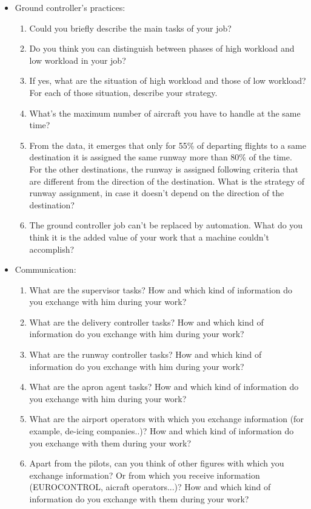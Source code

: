 \documentclass{article}
\begin{document}
\begin{itemize}
\begin{enumerate}
        \end{enumerate}
    \item Ground controller's practices:
        \begin{enumerate}
        	\item Could you briefly describe the main tasks of your job?
        	\item Do you think you can distinguish between phases of high workload and low workload in your job? 
        	\item If yes, what are the situation of high workload and those of low workload? For each of those situation, describe your strategy.
            \item What's the maximum number of aircraft you have to handle at the same time?
            \item From the data, it emerges that only for 55\% of departing flights to a same destination it is assigned the same runway more than 80\% of the time. For the other destinations, the runway is assigned following criteria that are different from the direction of the destination. What is the strategy of runway assignment, in case it doesn't depend on the direction of the destination?
            \item The ground controller job can't be replaced by automation. What do you think it is the added value of your work that a machine couldn't accomplish?
        \end{enumerate}
    \item Communication:
        \begin{enumerate}
            \item What are the supervisor tasks? How and which kind of information do you exchange with him during your work?
            \item What are the delivery controller tasks? How and which kind of information do you exchange with him during your work?
            \item What are the runway controller tasks? How and which kind of information do you exchange with him during your work?
            \item What are the apron agent tasks? How and which kind of information do you exchange with him during your work?
            \item What are the airport operators with which you exchange information (for example, de-icing companies..)? How and which kind of information do you exchange with them during your work?
            \item Apart from the pilots, can you think of other figures with which you exchange information? Or from which you receive information (EUROCONTROL, aicraft operators...)?
            How and which kind of information do you exchange with them during your work?
        

\end{enumerate}
\end{itemize}
\end{document}
